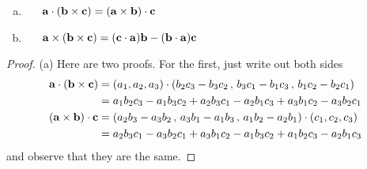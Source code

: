 \begin{lemma}\label{lem:tripProd}
\begin{enumerate}[(a)]
\item\ \ \ 
$\mathbf{a}\cdot(\mathbf{b}\times\mathbf{c})=(\mathbf{a}\times\mathbf{b})\cdot\mathbf{c}$
\item\ \ \ 
$\mathbf{a}\times(\mathbf{b}\times\mathbf{c})=(\mathbf{c}\cdot\mathbf{a})\mathbf{b}-(\mathbf{b}\cdot\mathbf{a})\mathbf{c}$
\end{enumerate}
\end{lemma}
\begin{proof} (a)
Here are two proofs.
For the first, just write out both sides
\begin{align*}
\mathbf{a}\cdot(\mathbf{b}\times\mathbf{c})
&=(a_1,a_2,a_3)\cdot(b_2c_3-b_3c_2\,,\,b_3c_1-b_1c_3\,,\,b_1c_2-b_2c_1)\\
&=a_1b_2c_3-a_1b_3c_2+a_2b_3c_1-a_2b_1c_3+a_3b_1c_2-a_3b_2c_1\\
(\mathbf{a}\times\mathbf{b})\cdot\mathbf{c}
&=(a_2b_3-a_3b_2\,,\,a_3b_1-a_1b_3\,,\,a_1b_2-a_2b_1)\cdot(c_1,c_2,c_3)\\
&=a_2b_3c_1-a_3b_2c_1+a_3b_1c_2-a_1b_3c_2+a_1b_2c_3-a_2b_1c_3
\end{align*}
and observe that they are the same.


\end{proof}
